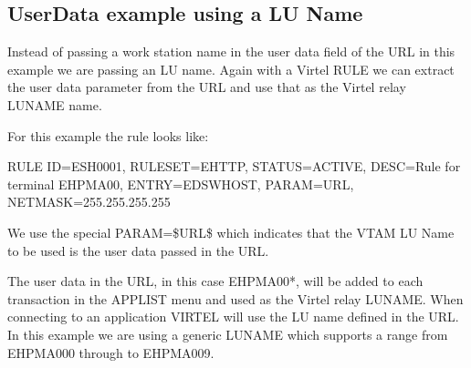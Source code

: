 \documentclass[letterpaper,10pt,english]{sphinxmanual}
\begin{document}
\ignorespaces 

\subsection{UserData example using a LU Name}
\label{\detokenize{connectivity_guide:userdata-example-using-a-lu-name}}\label{\detokenize{connectivity_guide:index-151}}
\sphinxAtStartPar
Instead of passing a work station name in the user data field of the URL in this example we are passing an LU name. Again with a Virtel RULE we can extract the user data parameter from the URL and use that as the Virtel relay LUNAME name.

\sphinxAtStartPar
{}

\sphinxAtStartPar
For this example the rule looks like:\sphinxhyphen{}

\begin{sphinxVerbatim}[commandchars=\\\{\}]
RULE ID=ESH0001,
RULESET=E\PYGZhy{}HTTP,
STATUS=ACTIVE,
DESC=\PYGZsq{}Rule for terminal EHPMA00\PYGZsq{},
ENTRY=EDSWHOST,
PARAM=\PYGZdl{}URL\PYGZdl{},
NETMASK=255.255.255.255
\end{sphinxVerbatim}

\sphinxAtStartPar
We use the special PARAM=\$URL\$ which indicates that the VTAM LU Name to be used is the user data passed in the URL.

\sphinxAtStartPar
{}

\sphinxAtStartPar
{}

\sphinxAtStartPar
The user data in the URL, in this case EHPMA00*, will be added to each transaction in the APPLIST menu and used as the Virtel relay LUNAME. When connecting to an application VIRTEL will use the LU name defined in the URL. In this example we are using a generic LUNAME which supports a range from EHPMA000 through to EHPMA009.

\ignorespaces 
\end{document}

